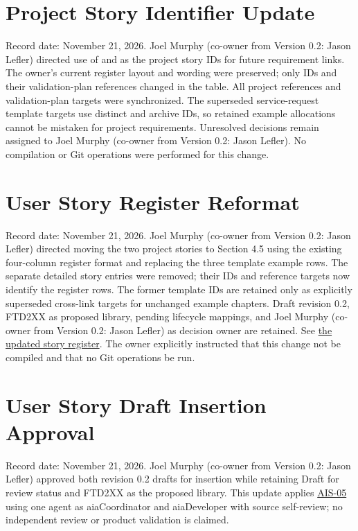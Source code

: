 \section{Project Story Identifier Update}
Record date: November 21, 2026. Joel Murphy (co-owner from Version 0.2: Jason Lefler) directed use of
 and  as the project story IDs for
future requirement links. The owner's current register layout and wording
were preserved; only IDs and their validation-plan references changed in the
table. All project references and validation-plan targets were synchronized.
The superseded service-request template targets use distinct
 and  archive IDs,
so retained example allocations cannot be mistaken for project requirements.
Unresolved decisions remain assigned to Joel Murphy (co-owner from Version 0.2: Jason Lefler). No compilation or Git
operations were performed for this change.

\section{User Story Register Reformat}
Record date: November 21, 2026. Joel Murphy (co-owner from Version 0.2: Jason Lefler) directed moving the two project
stories to Section 4.5 using the existing four-column register format and
replacing the three template example rows. The separate detailed story
entries were removed; their IDs and reference targets now identify the
register rows. The former template IDs are retained only as explicitly
superseded cross-link targets for unchanged example chapters. Draft revision
0.2, FTD2XX as proposed library, pending lifecycle mappings, and Joel Murphy (co-owner from Version 0.2: Jason Lefler)
as decision owner are retained. See
\hyperref[Table:UserStories]{the updated story register}. The owner explicitly
instructed that this change not be compiled and that no Git operations be run.

\section{User Story Draft Insertion Approval}
\label{Section:StoryDraftInsertionLog}
Record date: November 21, 2026. Joel Murphy (co-owner from Version 0.2: Jason Lefler) approved both revision 0.2 drafts
for insertion while retaining Draft for review status and FTD2XX as the
proposed library. This update applies \hyperref[Skill:AIS-05]{AIS-05} using
one agent as aiaCoordinator and aiaDeveloper with source self-review; no
independent review or product validation is claimed.

